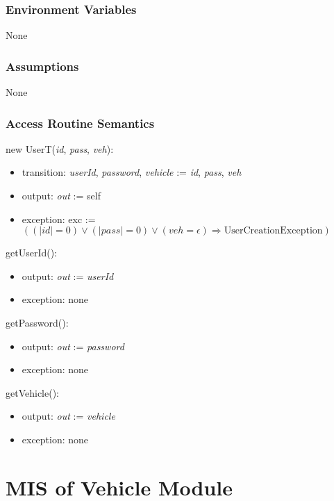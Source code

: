 \documentclass[12pt, titlepage]{article}
\begin{document}
\subsubsection{Environment Variables}
None

\subsubsection{Assumptions}
None

\subsubsection{Access Routine Semantics}

\noindent new UserT(\textit{id}, \textit{pass}, \textit{veh}):
\begin{itemize}
\item transition: \textit{userId}, \textit{password}, \textit{vehicle} :=
\textit{id}, \textit{pass}, \textit{veh} 
\item output: \textit{out} := self
\item exception: exc := $((|id| = 0) \vee (|pass| = 0) \vee (veh = \epsilon)
\Rightarrow \text{UserCreationException})$
\end{itemize}

\noindent getUserId():
\begin{itemize} 
\item output: \textit{out} := \textit{userId} 
\item exception: none
\end{itemize}

\noindent getPassword():
\begin{itemize} 
\item output: \textit{out} := \textit{password} 
\item exception: none
\end{itemize}

\noindent getVehicle():
\begin{itemize} 
\item output: \textit{out} := \textit{vehicle} 
\item exception: none
\end{itemize}

\newpage

\section{MIS of Vehicle Module} 
\label{vehicle:Module}
\end{document}
